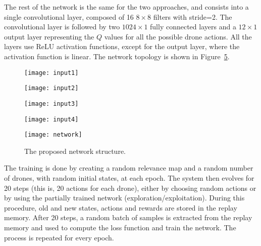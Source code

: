 \documentclass{article}
\begin{document}
The rest of the network is the same for the two approaches, and consists into a single convolutional layer, composed of 16 $8\times 8$ filters with stride=2. The convolutional layer is followed by two $1024\times 1$ fully connected layers and a $12\times 1$ output layer representing the $Q$ values for all the possible drone actions. All the layers use ReLU activation functions, except for the output layer, where the activation function is linear. The network topology is shown in Figure~\ref{fig:network}. 



\begin{figure*}[tbh]
	\centering
	\begin{subfigure}[t]{0.25\textwidth}
		\centering
		\texttt{[image: input1]}
		\caption{\label{fig:input:1}}
	\end{subfigure}%
	\begin{subfigure}[t]{0.25\textwidth}
		\centering
		\texttt{[image: input2]}
		\caption{\label{fig:input:2}}
	\end{subfigure}%
	\begin{subfigure}[t]{0.25\textwidth}
		\centering
		\texttt{[image: input3]}
		\caption{\label{fig:input:3}}
	\end{subfigure}%
	\begin{subfigure}[t]{0.25\textwidth}
		\centering
		\texttt{[image: input4]}
		\caption{\label{fig:input:4}}
	\end{subfigure}%
	\caption{Network input example. () a randomly-generated relevance map and two drones with their visual coverage; () the shared temporal relevance map, centered and rotated on drone 0; () the visual coverage of drone 0; () the visual coverage of all drones, as seen from drone 0. Network input for the greedy strategy is composed of () and () stacked; network input for the cooperative strategy also adds () to the stack.}
	\label{fig:input}
\end{figure*}

\begin{figure}
	\centering
	\texttt{[image: network]}
	\caption{The proposed network structure.}
	\label{fig:network}
\end{figure}

The training is done by creating a random relevance map and a random number of drones, with random initial states, at each epoch. The system then evolves for 20 steps (this is, 20 actions for each drone), either by choosing random actions or by using the partially trained network (exploration/exploitation). During this procedure, old and new states, actions and rewards are stored in the replay memory. After 20 steps, a random batch of samples is extracted from the replay memory and used to compute the loss function and train the network. The process is repeated for every epoch.
\end{document}
